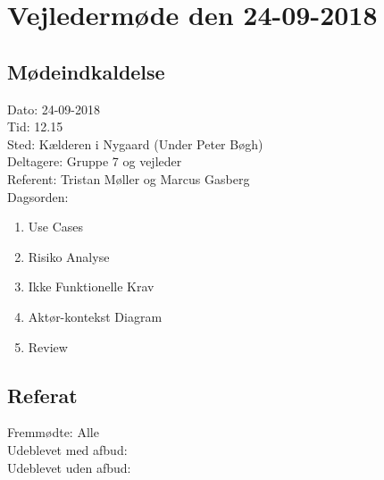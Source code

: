 \section{Vejledermøde den 24-09-2018}
\subsection{Mødeindkaldelse}
Dato: 24-09-2018
\\Tid: 12.15
\\Sted: Kælderen i Nygaard (Under Peter Bøgh)
\\Deltagere: Gruppe 7 og vejleder
\\Referent: Tristan Møller og Marcus Gasberg
\\Dagsorden:
\begin{enumerate}
    \item Use Cases
    \item Risiko Analyse
    \item Ikke Funktionelle Krav
    \item Aktør-kontekst Diagram
    \item Review
\end{enumerate}

\subsection{Referat}
 Fremmødte: Alle 
 \\Udeblevet med afbud:
 \\Udeblevet uden afbud: 
 
